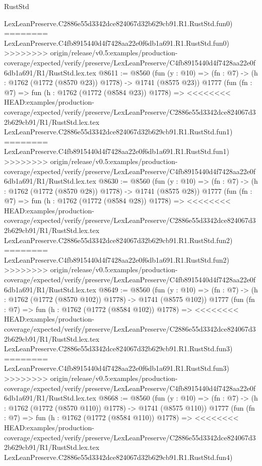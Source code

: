 \begin{lexlean}{RustStd}
\begin{coremodule}
{\begin{coremodule}
{{{{{{{{{{{{{{{    LexLeanPreserve.C2886e55d3342dce824067d32b629cb91.R1.RustStd.fun0)
========
    LexLeanPreserve.C4fb8915440d4f7428aa22e0f6db1a691.R1.RustStd.fun0)
>>>>>>>> origin/release/v0.5:examples/production-coverage/expected/verify/preserve/LexLeanPreserve/C4fb8915440d4f7428aa22e0f6db1a691/R1/RustStd.lex.tex
@8611 := @8560
    (fun (y : @10) => (fn : @7) -> (h : @1762 (@1772 (@8570 @23)) @1778) -> @1741 (@8575 @23))
    @1777
    (fun (fn : @7) =>
    fun (h : @1762 (@1772 (@8584 @23)) @1778) =>
<<<<<<<< HEAD:examples/production-coverage/expected/verify/preserve/LexLeanPreserve/C2886e55d3342dce824067d32b629cb91/R1/RustStd.lex.tex
    LexLeanPreserve.C2886e55d3342dce824067d32b629cb91.R1.RustStd.fun1)
========
    LexLeanPreserve.C4fb8915440d4f7428aa22e0f6db1a691.R1.RustStd.fun1)
>>>>>>>> origin/release/v0.5:examples/production-coverage/expected/verify/preserve/LexLeanPreserve/C4fb8915440d4f7428aa22e0f6db1a691/R1/RustStd.lex.tex
@8630 := @8560
    (fun (y : @10) => (fn : @7) -> (h : @1762 (@1772 (@8570 @28)) @1778) -> @1741 (@8575 @28))
    @1777
    (fun (fn : @7) =>
    fun (h : @1762 (@1772 (@8584 @28)) @1778) =>
<<<<<<<< HEAD:examples/production-coverage/expected/verify/preserve/LexLeanPreserve/C2886e55d3342dce824067d32b629cb91/R1/RustStd.lex.tex
    LexLeanPreserve.C2886e55d3342dce824067d32b629cb91.R1.RustStd.fun2)
========
    LexLeanPreserve.C4fb8915440d4f7428aa22e0f6db1a691.R1.RustStd.fun2)
>>>>>>>> origin/release/v0.5:examples/production-coverage/expected/verify/preserve/LexLeanPreserve/C4fb8915440d4f7428aa22e0f6db1a691/R1/RustStd.lex.tex
@8649 := @8560
    (fun (y : @10) => (fn : @7) -> (h : @1762 (@1772 (@8570 @102)) @1778) -> @1741 (@8575 @102))
    @1777
    (fun (fn : @7) =>
    fun (h : @1762 (@1772 (@8584 @102)) @1778) =>
<<<<<<<< HEAD:examples/production-coverage/expected/verify/preserve/LexLeanPreserve/C2886e55d3342dce824067d32b629cb91/R1/RustStd.lex.tex
    LexLeanPreserve.C2886e55d3342dce824067d32b629cb91.R1.RustStd.fun3)
========
    LexLeanPreserve.C4fb8915440d4f7428aa22e0f6db1a691.R1.RustStd.fun3)
>>>>>>>> origin/release/v0.5:examples/production-coverage/expected/verify/preserve/LexLeanPreserve/C4fb8915440d4f7428aa22e0f6db1a691/R1/RustStd.lex.tex
@8668 := @8560
    (fun (y : @10) => (fn : @7) -> (h : @1762 (@1772 (@8570 @110)) @1778) -> @1741 (@8575 @110))
    @1777
    (fun (fn : @7) =>
    fun (h : @1762 (@1772 (@8584 @110)) @1778) =>
<<<<<<<< HEAD:examples/production-coverage/expected/verify/preserve/LexLeanPreserve/C2886e55d3342dce824067d32b629cb91/R1/RustStd.lex.tex
    LexLeanPreserve.C2886e55d3342dce824067d32b629cb91.R1.RustStd.fun4)
}}}}}}}}}}}}}}}
\end{coremodule}}
\end{coremodule}
\end{lexlean}
